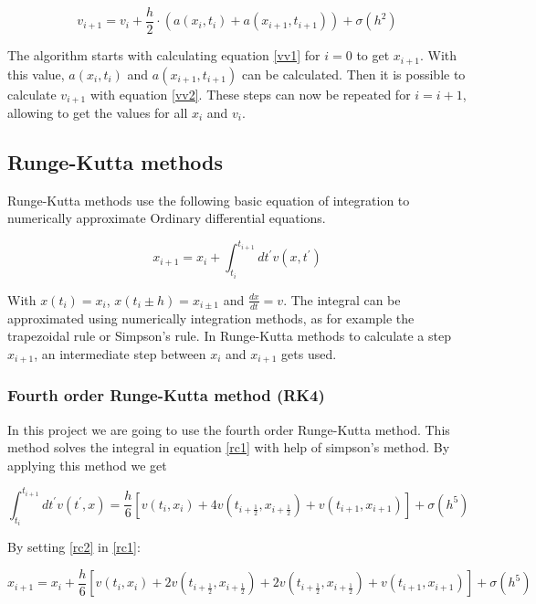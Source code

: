 \documentclass[10pt,a4paper]{article}
\begin{document}
\begin{equation}
\label{vv2}
v_{i+1} = v_i + \frac{h}{2} \cdot (a(x_i, t_i) + a(x_{i+1}, t_{i+1})) + \sigma(h^2)
\end{equation}

The algorithm starts with calculating equation \eqref{vv1} for $i = 0$ to get $x_{i+1}$. With this value, $a(x_i, t_i)$ and $a(x_{i+1}, t_{i+1})$ can be calculated. Then it is possible to calculate $v_{i+1}$ with equation \eqref{vv2}. These steps can now be repeated for $i = i+1$, allowing to get the values for all $x_i$ and $v_i$.

\subsection{Runge-Kutta methods}

Runge-Kutta methods use the following basic equation of integration to numerically approximate Ordinary differential equations.

\begin{equation}
\label{rc1}
x_{i+1} = x_i + \int_{t_i}^{t_{i+1}} dt^{'} v(x, t^{'})
\end{equation}

With $x(t_i) = x_i$, $x(t_i \pm h) = x_{i \pm 1}$ and $\frac{dx}{dt} = v$. The integral can be approximated using numerically integration methods, as for example the trapezoidal rule or Simpson's rule. In Runge-Kutta methods to calculate a step $x_{i+1}$, an intermediate step between $x_i$ and $x_{i+1}$ gets used.

\subsubsection{Fourth order Runge-Kutta method (RK4)}
\label{subsubsec:rc4}

In this project we are going to use the fourth order Runge-Kutta method. This method solves the integral in equation \eqref{rc1} with help of simpson's method. By applying this method we get

\begin{equation}
\label{rc2}
\int_{t_i}^{t_{i+1}} dt^{'} v(t^{'}, x) = \frac{h}{6} [v(t_i, x_i) +4 v(t_{i+\frac{1}{2}}, x_{i+\frac{1}{2}}) + v(t_{i+1}, x_{i+1})] + \sigma(h^5)
\end{equation}

By setting \eqref{rc2} in \eqref{rc1}:

\begin{equation}
\label{rc3}
x_{i+1} = x_i + \frac{h}{6} [v(t_i, x_i) + 2 v(t_{i+\frac{1}{2}}, x_{i+\frac{1}{2}}) + 2 v(t_{i+\frac{1}{2}}, x_{i+\frac{1}{2}}) + v(t_{i+1}, x_{i+1})] + \sigma(h^5)
\end{equation}
\end{document}
